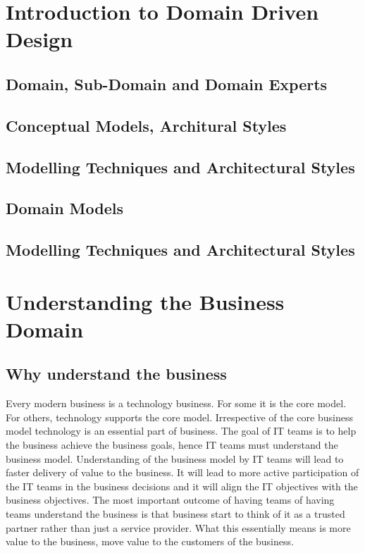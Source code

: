 \documentclass[a4paper, 11pt]{book}
\begin{document}
    \chapter{Introduction to Domain Driven Design}


    \section{Domain, Sub-Domain and Domain Experts}


    \section{Conceptual Models, Architural Styles}


    \section{Modelling Techniques and Architectural Styles}


    \section{Domain Models}


    \section{Modelling Techniques and Architectural Styles}


    \chapter{Understanding the Business Domain}


    \section{Why understand the business}
    Every modern business is a technology business. For some it is the core model. For others, technology supports the core model.
    Irrespective of the core business model technology is an essential part of business.
    The goal of IT teams is to help the business achieve the business goals, hence IT teams must understand the business model.
    Understanding of the business model by IT teams will lead to faster delivery of value to the business.
    It will lead to more active participation of the IT teams in the business decisions and it will align the IT objectives with the business objectives.
    The most important outcome of having teams of having teams understand the business is that business start to think of it as a trusted partner rather than just a service provider.
    What this essentially means is more value to the business, move value to the customers of the business.
\end{document}
